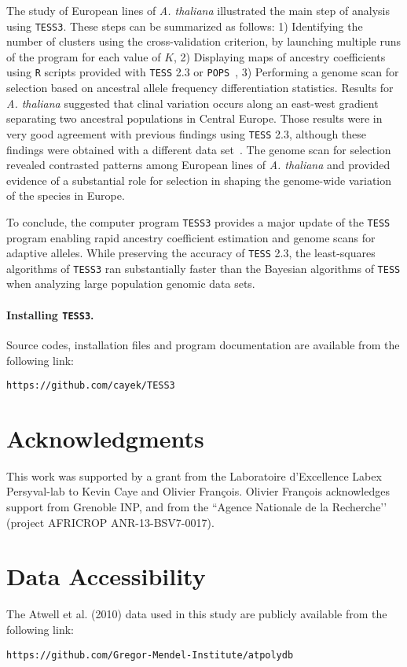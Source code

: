 The study of European lines of {\it A. thaliana} illustrated the main step of analysis using {\tt TESS3}. These steps can be summarized as follows: 1) Identifying the number of clusters using the cross-validation criterion, by launching multiple runs of the program for each value of $K$, 2) Displaying maps of ancestry coefficients using {\tt R} scripts provided with {\tt TESS} 2.3 or {\tt POPS}~\citep{jay2012forecasting}, 3) Performing a genome scan for selection based on ancestral allele frequency differentiation statistics. Results for {\it A. thaliana} suggested that clinal variation occurs along an east-west gradient separating two ancestral populations in Central Europe. Those results were in very good agreement with previous findings using {\tt TESS} 2.3, although these findings were obtained with a different data set~\citep{franccois2008demographic}. The genome scan for selection revealed contrasted patterns  among European lines of {\it A. thaliana} and provided evidence of a substantial role for selection in shaping the genome-wide variation of the species in Europe.

To conclude,  the computer program {\tt TESS3} provides a major update of the {\tt TESS} program  enabling rapid ancestry coefficient estimation and genome scans for adaptive alleles. While preserving the accuracy of {\tt TESS} 2.3, the least-squares algorithms of {\tt TESS3} ran substantially faster than the Bayesian algorithms of {\tt TESS} when analyzing large population genomic data sets.


\paragraph{Installing {\tt TESS3}.} Source codes, installation files and program documentation are available from the following link: 

{\tt https://github.com/cayek/TESS3}

\section*{Acknowledgments}
This work was supported by a grant from the Laboratoire d\rq{}Excellence Labex Persyval-lab to Kevin Caye and Olivier Fran\c{c}ois. Olivier Fran\c{c}ois acknowledges support from Grenoble INP, and from the ``Agence Nationale de la Recherche\rq\rq{} (project AFRICROP ANR-13-BSV7-0017). 

\section*{Data Accessibility} The Atwell et al. (2010) data used in this study are publicly available from the following link:\par
 {\tt https://github.com/Gregor-Mendel-Institute/atpolydb}

